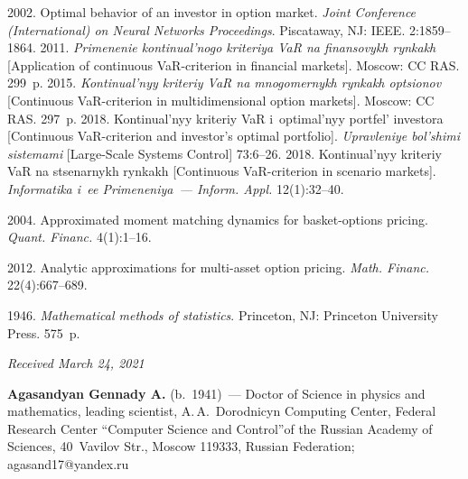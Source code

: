   \begin{multicols}{2}

\renewcommand{\bibname}{\protect\rmfamily References}

{\small\frenchspacing
 {%
 \begin{thebibliography}{9}
   2002. Optimal behavior of an investor in option market. 
\textit{Joint Conference (International) on Neural Networks Proceedings}. Piscataway, 
NJ: IEEE. 2:1859--1864. 
   2011. \textit{Primenenie kontinual'nogo kriteriya VaR 
na finansovykh rynkakh} [Application of continuous VaR-criterion in financial 
markets]. Moscow: CC RAS. 299~p.
   2015. \textit{Kontinual'nyy kriteriy VaR na 
mnogomernykh rynkakh optsionov} [Continuous VaR-criterion in multidimensional 
option markets]. Moscow: CC RAS. 297~p. 
   2018. Kontinual'nyy kriteriy VaR i~optimal'nyy 
portfel' investora [Continuous VaR-criterion and investor's optimal portfolio]. 
\textit{Upravleniye bol'shimi sistemami} [Large-Scale Systems Control] 73:6--26. 
   2018. Kontinual'nyy kriteriy VaR na stsenarnykh 
rynkakh [Continuous VaR-criterion in scenario markets]. \textit{Informatika i~ee 
Primeneniya~--- Inform. Appl.} 12(1):32--40. 
  
   2004. Approximated 
moment matching dynamics for basket-options pricing. \textit{Quant. Financ.} 
4(1):1--16. 

   2012. Analytic approximations for  
multi-asset option pricing. \textit{Math. Financ.} 22(4):667--689.

   1946. \textit{Mathematical methods of statistics}. Princeton, 
NJ: Princeton University Press. 575~p.
\end{thebibliography}

 }
 }

\end{multicols}

\vspace*{-6pt}

\hfill{\small\textit{Received March 24, 2021}}
  
  \Contrl
  
  \noindent
  \textbf{Agasandyan Gennady A.} (b.\ 1941)~--- Doctor of Science in physics and 
mathematics, leading scientist, A.\,A.~Dorodnicyn Computing Center, Federal 
Research Center ``Computer Science and Control''of the Russian Academy of 
Sciences, 40~Vavilov Str., Moscow 119333, Russian Federation; 
\mbox{agasand17@yandex.ru}
  

   

\label{end\stat}

\renewcommand{\bibname}{\protect\rm Литература}    